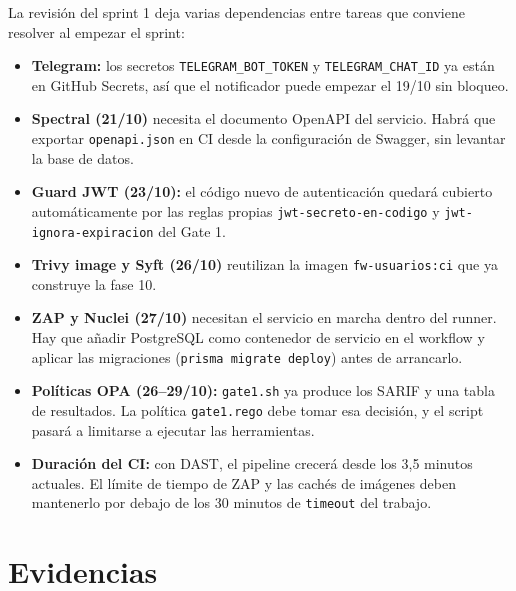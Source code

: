 \documentclass[11pt,a4paper]{report}
\begin{document}
La revisión del sprint 1 deja varias dependencias entre tareas que conviene resolver al empezar
el sprint:

\begin{itemize}
\item \textbf{Telegram:} los secretos \texttt{TELEGRAM\_BOT\_TOKEN} y \texttt{TELEGRAM\_CHAT\_ID} ya
están en GitHub Secrets, así que el notificador puede empezar el 19/10 sin bloqueo.
\item \textbf{Spectral (21/10)} necesita el documento OpenAPI del servicio. Habrá que exportar
\texttt{openapi.json} en CI desde la configuración de Swagger, sin levantar la base de datos.
\item \textbf{Guard JWT (23/10):} el código nuevo de autenticación quedará cubierto
automáticamente por las reglas propias \texttt{jwt-secreto-en-codigo} y
\texttt{jwt-ignora-expiracion} del Gate 1.
\item \textbf{Trivy image y Syft (26/10)} reutilizan la imagen \texttt{fw-usuarios:ci} que ya
construye la fase 10.
\item \textbf{ZAP y Nuclei (27/10)} necesitan el servicio en marcha dentro del runner. Hay que
añadir PostgreSQL como contenedor de servicio en el workflow y aplicar las migraciones
(\texttt{prisma migrate deploy}) antes de arrancarlo.
\item \textbf{Políticas OPA (26--29/10):} \texttt{gate1.sh} ya produce los SARIF y una tabla de
resultados. La política \texttt{gate1.rego} debe tomar esa decisión, y el script pasará a
limitarse a ejecutar las herramientas.
\item \textbf{Duración del CI:} con DAST, el pipeline crecerá desde los 3,5 minutos actuales. El
límite de tiempo de ZAP y las cachés de imágenes deben mantenerlo por debajo de los 30 minutos de
\texttt{timeout} del trabajo.
\end{itemize}

\appendix
\chapter{Evidencias}
\end{document}
